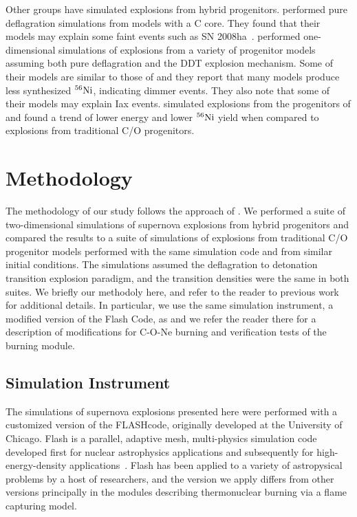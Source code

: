 \documentclass[iop,apj]{emulateapj}
\newcommand{\Ni}[1]{\ensuremath{{}^{#1}{\rm Ni}}}
\newcommand{\code}[1]{\textsc{#1}}
\newcommand{\FLASH}{\code{FLASH}}
\begin{document}
Other groups have simulated explosions from hybrid progenitors. 
\citet{kromeretal2015} performed pure deflagration simulations from models 
with a C core. They found that their models may explain some faint events 
such as SN 2008ha~\citep{foleyetal2009}.
\citet{bravoetal2016} performed one-dimensional simulations of explosions from 
a variety of progenitor models assuming both pure deflagration and the DDT 
explosion mechanism. 
Some of their models are similar to those of \citep{denissenkovetal2015} and 
they report that many models produce less synthesized
\Ni{56}, indicating dimmer events. They also note that some of their
models may explain Iax events.
\citet{willcoxetal2016} simulated explosions from the progenitors of 
\citep{denissenkovetal2015} and found a trend of lower energy and lower
\Ni{56} yield when compared to explosions from traditional C/O progenitors.


\section{Methodology}

The methodology of our study follows the approach of \citet{willcoxetal2016}. 
We performed a suite of two-dimensional simulations of supernova explosions
from hybrid progenitors and compared the results to a suite of simulations
of explosions from traditional C/O progenitor models performed with the
same simulation code and from similar initial conditions. The simulations assumed
the deflagration to detonation transition explosion paradigm, and the
transition densities were the same in both suites. We briefly our methodoly
here, and refer to the reader to previous work for additional details.
In particular, we use the same simulation instrument, a modified version
of the Flash Code, as \citet{willcoxetal2016} and we refer the reader there 
for a description of modifications for C-O-Ne burning and verification tests
of the burning module.

\subsection{Simulation Instrument}

The simulations of supernova explosions presented here were performed
with a customized version of the \FLASH code, originally developed
at the University of Chicago.
Flash is a parallel, adaptive mesh, multi-physics simulation code
developed first for nuclear astrophysics applications and subsequently
for high-energy-density applications~\cite{Fryxetal00,calder.curtis.ea:high-performance,
calder.fryxell.ea:on,flash_pragmatic,flash_evolution}. 
Flash has been applied to a variety of astropysical problems by a host
of researchers, and the version we apply differs from other versions
principally in the modules describing thermonuclear burning via a 
flame capturing model. 
\end{document}
